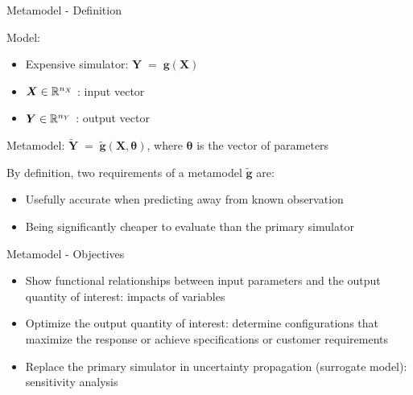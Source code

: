 \documentclass{beamer}
\begin{document}
\begin{frame}[t]{Metamodel - Definition}

Model:
\begin{itemize}
\item Expensive simulator: $\boldsymbol{Y} \; = \; \boldsymbol{g}(\boldsymbol{X})$
\item $\boldsymbol{X} \in\mathbb{R}^{n_X}$ : input vector
\item $\boldsymbol{Y}\in\mathbb{R}^{n_Y}$ : output vector
\end{itemize}
   
Metamodel: $ \widetilde{\boldsymbol{Y} } \; = \; \tilde{\boldsymbol{g}}(\boldsymbol{X}, \boldsymbol{\theta})$, where $\boldsymbol{\theta}$ is the vector of parameters

By definition, two requirements of a metamodel $\tilde{\boldsymbol{g}}$ are:
\begin{itemize}
\item Usefully accurate when predicting away from known observation
\item Being significantly cheaper to evaluate than the primary simulator
\end{itemize}
 

\end{frame}


\begin{frame}[t]{Metamodel - Objectives}

\begin{itemize}
\item Show functional relationships between input parameters and the output quantity of interest: impacts of variables 
\item Optimize the output quantity of interest: determine configurations that maximize the response or achieve specifications or customer requirements
\item Replace the primary simulator in uncertainty propagation (surrogate model):  sensitivity analysis
\end{itemize}

\end{frame}
\end{document}
